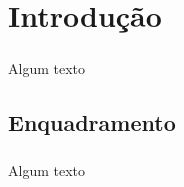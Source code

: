 \chapter*{\thechapter \quad Introdução}
\paragraph{}
Algum texto

\section{Enquadramento}
\paragraph{}
Algum texto